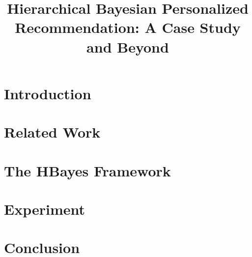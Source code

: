 \documentclass[letterpaper]{article}
\begin{document}
%
\title{Hierarchical Bayesian Personalized Recommendation: A Case Study and Beyond}

\maketitle
\begin{abstract}
\begin{quote}

\end{quote}
\end{abstract}
\section{Introduction}
\label{sec:intro}


\section{Related Work}
\label{sec:related}


\section{The HBayes Framework}
\label{sec:method}


\section{Experiment}
\label{sec:experiment}


\section{Conclusion}
\label{sec:conclusion}




\end{document}
